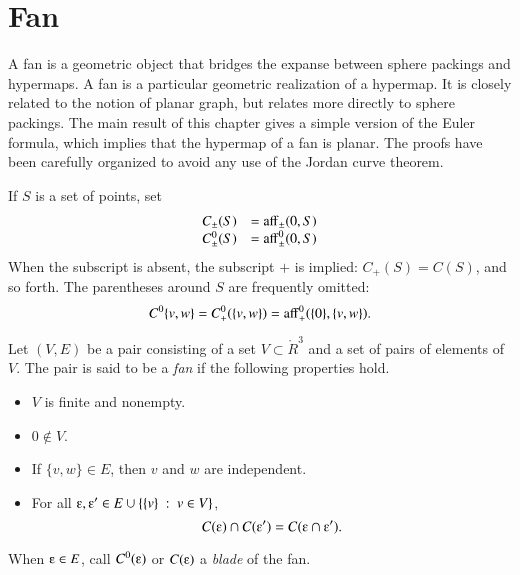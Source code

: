 
\chapter{Fan}\label{sec:fan}

A fan is a geometric object that bridges the expanse between sphere packings and hypermaps.  A fan is a particular geometric realization of a hypermap.  It is closely related to the notion of planar graph, but relates more directly to sphere packings.   The main result of this chapter gives a simple version of the Euler formula, which implies that the hypermap of a fan is planar.  The proofs have been carefully organized to avoid any use of the Jordan curve theorem.



If $S$ is a set of points,
set
  $$
  \begin{array}{lll}
  C_\pm(S) &= {\operatorname{aff}}_\pm(0,S)\\
  C^0_\pm(S) &= {\operatorname{aff}}^0_\pm(0,S)\\
  \end{array}
  $$
When the subscript is absent, the subscript $+$ is implied: $C_+(S) = C(S)$, and
so forth.  The parentheses around $S$ are frequently omitted: 
$$C^0\{v,w\}=C^0_+(\{v,w\}) = {\operatorname{aff}}^0_+(\{0\},\{v,w\}).$$

\begin{definition}[fan]  
Let $(V,E)$ be a pair consisting of a set $V\subset \ring{R}^3$ and a set of pairs of elements of $V$.  The pair is said to be
a {\it fan\/} if the following properties hold.
    \begin{itemize}
    \item $V$ is finite and nonempty.
    \item $0\not\in V$.
    \item If $\{v,w\} \in E$, then $v$ and $w$ are independent.
    \item 
    For all $\e ,\e '\in E \cup \{\{v\}\mid v\in V\}$, 
 $$C(\e )\cap C(\e ') = C(\e \cap \e ').$$
    \end{itemize}
When $\e\in E$, call $C^0(\e)$ or $C(\e)$ a {\it blade\/} of the fan.
\end{definition}
\bigskip\hbox{~}\bigskip


